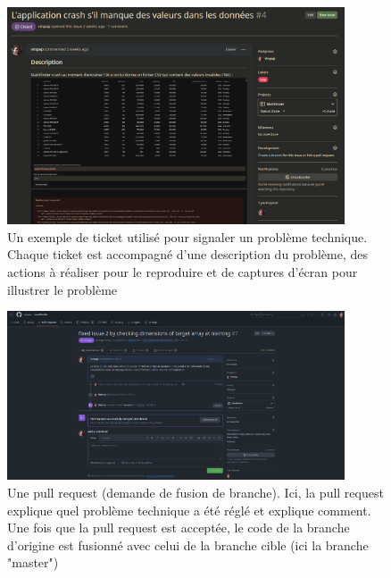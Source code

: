 \documentclass[french]{article}
\begin{document}
    \begin{figure}[h!]
        \includegraphics[width=10cm]{gh_issue}
        \centering
        \caption{Un exemple de ticket utilisé pour signaler un problème technique. Chaque ticket est accompagné d'une description du problème, des actions à réaliser pour le reproduire et de captures d'écran pour illustrer le problème}
        \centering
    \end{figure}
    \begin{figure}[h!]
        \includegraphics[width=10cm]{gh_pull_request}
        \centering
        \caption{Une pull request (demande de fusion de branche). Ici, la pull request explique quel problème technique a été réglé et explique comment. Une fois que la pull request est acceptée, le code de la branche d'origine est fusionné avec celui de la branche cible (ici la branche "master")}
        \centering
    \end{figure}
\end{document}
